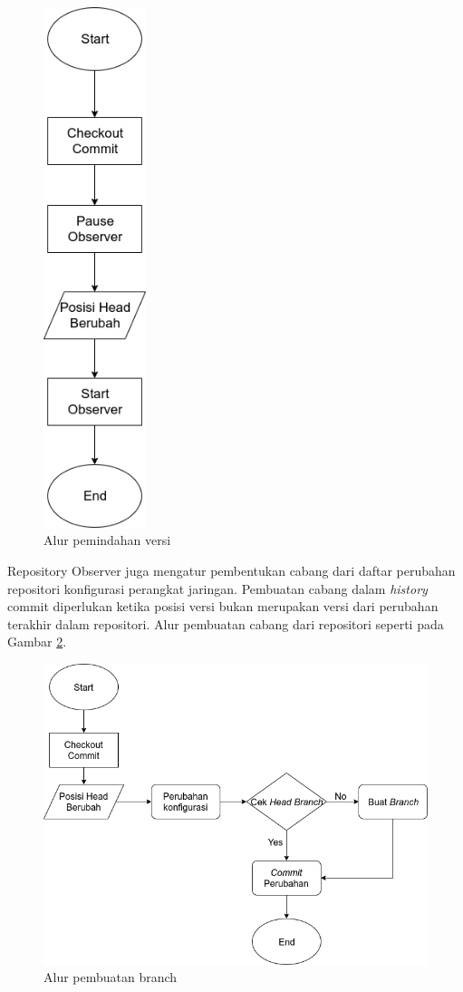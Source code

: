         	 \begin{figure}[H]
        		\centering
        		\includegraphics[width=3cm]{Images/C-3/Flow-Pemindahan-Versi.png}
        		\caption{Alur pemindahan versi}
        		\label{CheckoutBranch}
        	\end{figure}
        	\newpage
	        \indent Repository Observer juga mengatur pembentukan cabang dari daftar perubahan repositori konfigurasi perangkat jaringan. Pembuatan cabang dalam \textit{history} commit diperlukan ketika posisi versi bukan merupakan versi dari perubahan terakhir dalam repositori. Alur pembuatan cabang dari repositori seperti pada Gambar \ref{CreateBranch}.
	        \begin{figure}[H]
	        	\centering
	        	\includegraphics[width=\textwidth]{Images/C-3/CreateBranch.png}
	        	\caption{Alur pembuatan branch}
	        	\label{CreateBranch}
	        \end{figure}
        
